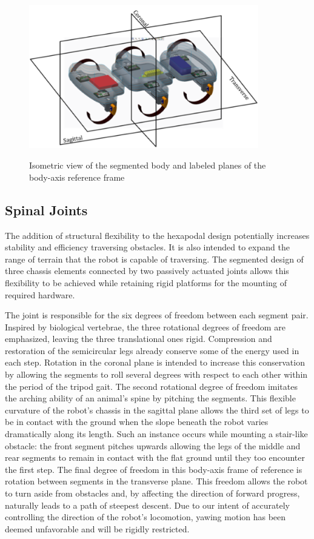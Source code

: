 \documentclass[11pt]{article}
\begin{document}
\begin{figure}[ht]
\centering
\includegraphics[width=10cm,height=7cm]{bodyplanes.png}
\caption{Isometric view of the segmented body and labeled planes of the body-axis reference frame}
\end{figure}

\subsection{Spinal Joints}

The addition of structural flexibility to the hexapodal design potentially increases stability and efficiency traversing obstacles.  It is also intended to expand the range of terrain that the robot is capable of traversing. The segmented design of three chassis elements connected by two passively actuated joints allows this flexibility to be achieved while retaining rigid platforms for the mounting of required hardware. 

The joint is responsible for the six degrees of freedom between each segment pair. Inspired by biological vertebrae, the three rotational degrees of freedom are emphasized, leaving the three translational ones rigid. Compression and restoration of the semicircular legs already conserve some of the energy used in each step. Rotation in the coronal plane is intended to increase this conservation by allowing the segments to roll several degrees with respect to each other within the period of the tripod gait. The second rotational degree of freedom imitates the arching ability of an animal's spine by pitching the segments. This flexible curvature of the robot's chassis in the sagittal plane allows the third set of legs to be in contact with the ground when the slope beneath the robot varies dramatically along its length.  Such an instance occurs while mounting a stair-like obstacle: the front segment pitches upwards allowing the legs of the middle and rear segments to remain in contact with the flat ground until they too encounter the first step. The final degree of freedom in this body-axis frame of reference is rotation between segments in the transverse plane. This freedom allows the robot to turn aside from obstacles and, by affecting the direction of forward progress, naturally leads to a path of steepest descent. Due to our intent of accurately controlling the direction of the robot's locomotion, yawing motion has been deemed unfavorable and will be rigidly restricted.
\end{document}
